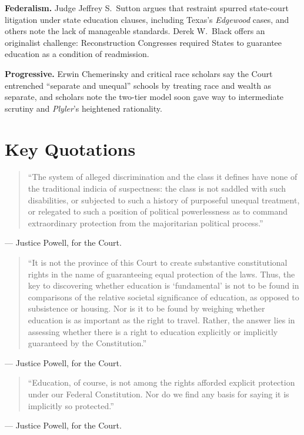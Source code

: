 \documentclass[12pt]{article}
\begin{document}
\textbf{Federalism.} Judge Jeffrey S.\ Sutton argues that restraint spurred state-court litigation under state education clauses, including Texas's \textit{Edgewood} cases, and others note the lack of manageable standards. Derek W.\ Black offers an originalist challenge: Reconstruction Congresses required States to guarantee education as a condition of readmission.

\textbf{Progressive.} Erwin Chemerinsky and critical race scholars say the Court entrenched ``separate and unequal'' schools by treating race and wealth as separate, and scholars note the two-tier model soon gave way to intermediate scrutiny and \textit{Plyler}'s heightened rationality.

\section{Key Quotations}

\begin{quote}
``The system of alleged discrimination and the class it defines have none of the traditional indicia of suspectness: the class is not saddled with such disabilities, or subjected to such a history of purposeful unequal treatment, or relegated to such a position of political powerlessness as to command extraordinary protection from the majoritarian political process.''
\end{quote}
\noindent --- Justice Powell, for the Court.

\begin{quote}
``It is not the province of this Court to create substantive constitutional rights in the name of guaranteeing equal protection of the laws. Thus, the key to discovering whether education is `fundamental' is not to be found in comparisons of the relative societal significance of education, as opposed to subsistence or housing. Nor is it to be found by weighing whether education is as important as the right to travel. Rather, the answer lies in assessing whether there is a right to education explicitly or implicitly guaranteed by the Constitution.''
\end{quote}
\noindent --- Justice Powell, for the Court.

\begin{quote}
``Education, of course, is not among the rights afforded explicit protection under our Federal Constitution. Nor do we find any basis for saying it is implicitly so protected.''
\end{quote}
\noindent --- Justice Powell, for the Court.
\end{document}
